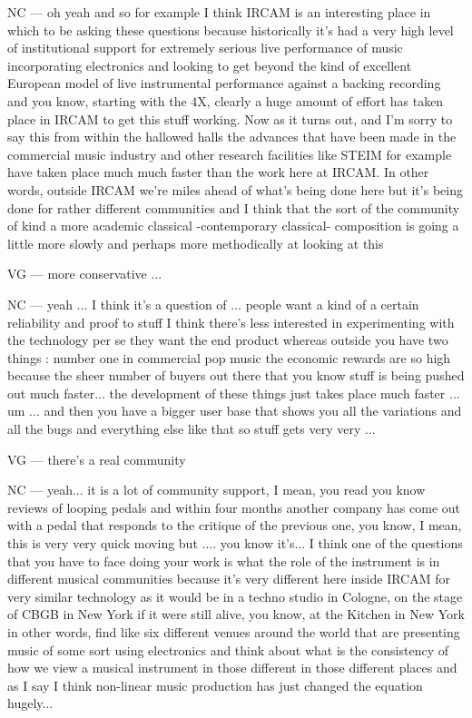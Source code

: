NC — oh yeah and so for example I think IRCAM is an interesting place in which to be asking these questions because historically it's had a very high level of institutional support for extremely serious live performance of music incorporating electronics and looking to get beyond the kind of excellent European model of live instrumental performance against a backing recording and you know, starting with the 4X, clearly a huge amount of effort has taken place in IRCAM to get this stuff working. Now as it turns out, and I'm sorry to say this from within the hallowed halls the advances that have been made in the commercial music industry and other research facilities like STEIM for example have taken place much much faster than the work here at IRCAM. In other words, outside IRCAM we're miles ahead of what's being done here but it's being done for rather different communities and I think that the sort of the community of kind a more academic classical -contemporary classical- composition is going a little more slowly and perhaps more methodically  at looking at this 

VG — more conservative ...

NC — yeah ... I think it's a question of ... people want a kind of a certain reliability and proof to stuff I think there's less interested in experimenting with the technology per se they want the end product whereas outside you have two things : number one in commercial pop music the economic rewards are so high because the sheer number of buyers out there that you know stuff is being pushed out much faster... the development of these things just takes place much faster ... um ... and then you have a bigger user base that shows you all the variations and all the bugs and everything else like that so stuff gets very very ... 

VG — there's a real community 

NC — yeah... it is a lot of community support, I mean, you read you know reviews of looping pedals and within four months another company has come out with a pedal that responds to the critique of the previous one, you know, I mean, this is very very quick moving but .... you know it's... I think one of the questions that you have to face doing your work is what the role of the instrument is in different musical communities because it's very different here inside IRCAM for very similar technology as it would be in a techno studio in Cologne, on the stage of CBGB in New York if it were still alive, you know, at the Kitchen in New York in other words, find like six different venues around the world that are presenting music of some sort using electronics and think about what is the consistency of how we view a musical instrument in those different in those different places and as I say I think non-linear music production has just changed the equation hugely... 

